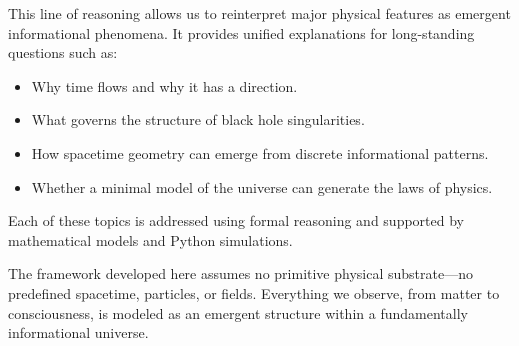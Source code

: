 \documentclass[11pt]{article}
\begin{document}
This line of reasoning allows us to reinterpret major physical features as emergent informational phenomena. It provides unified explanations for long-standing questions such as:
\begin{itemize}
      \item Why time flows and why it has a direction.
      \item What governs the structure of black hole singularities.
      \item How spacetime geometry can emerge from discrete informational patterns.
      \item Whether a minimal model of the universe can generate the laws of physics.
\end{itemize}

Each of these topics is addressed using formal reasoning and supported by mathematical models and Python simulations.

The framework developed here assumes no primitive physical substrate—no predefined spacetime, particles, or fields. Everything we observe, from matter to consciousness, is modeled as an emergent structure within a fundamentally informational universe.
\end{document}
